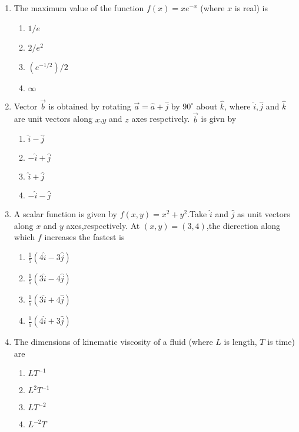 \documentclass[12pt]{article}
\begin{document}
\begin{enumerate}[label=Q.\arabic*]
	\item The maximum value of the function $f(x)=x e^{-x}$ (where $x$ is real) is 
		\begin{multicols}{4}
			\begin{enumerate}[label=(\Alph*)]
				\item $ 1/e $
				\item $ 2/e^2 $
				\item $ (e^{-1/2})/2$
				\item $\infty$
			\end{enumerate}
		\end{multicols}
	\item Vector $\vec{b}$ is obtained by rotating $\vec{a} =\hat{a} + \hat{j} $ by $90^\circ$  about $\hat{k}$, where $\hat{i},\hat{j}$ and $\hat{k}$ are unit vectors along $ x$,$y$ and $z$ axes respctively. $\vec{b}$ is givn by 

		\begin{multicols}{4}
			\begin{enumerate}[label=(\Alph*)]
				\item $\hat{i} - \hat{j}$
				\item $-\hat{i} + \hat{j}$
				\item $ \hat{i} + \hat{j}$
				\item $ -\hat{i} - \hat{j}$
			\end{enumerate}
		\end{multicols}
	\item A scalar function is given by $f(x,y) = x^2 + y^2 $.Take $\hat{i}$ and $\hat{j}$ as unit vectors along $x$ and $y$ axes,respectively. At $ (x,y) =(3,4)$,the dierection along which $f$ increases the fastest is 
		\begin{multicols}{4}
			\begin{enumerate}[label=(\Alph*)]
				\item $\frac{1}{5}(4\hat{i} - 3\hat{j})$
				\item $\frac{1}{5}(3\hat{i} - 4\hat{j})$
				\item $\frac{1}{5}(3\hat{i} + 4\hat{j})$
				\item $\frac{1}{5}(4\hat{i} + 3\hat{j})$
			\end{enumerate}
		\end{multicols}
	\item The dimensions of kinematic viscosity of a fluid (where $L$ is length, $T$ is time) are
		\begin{multicols}{4}
			\begin{enumerate}[label=(\Alph*)]
				\item $LT^{-1}$
				\item $L^2T^{-1}$
				\item $LT^{-2}$
				\item $L^{-2}T$
			\end{enumerate}
		\end{multicols}


\end{enumerate}
\end{document}

